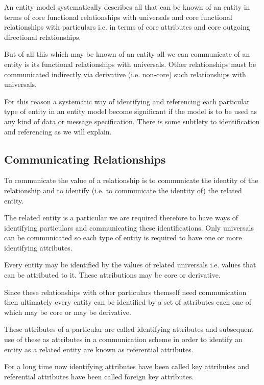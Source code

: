 \begin{oldtt}
\mynote An entity model systematically describes all that can be known of an entity
in terms of core functional relationships with universals and core functional relationships with particulars i.e. in terms of core attributes and core outgoing directional relationships.

\mynote But of all this which  may be known of an entity all we can communicate of an entity is its functional relationships with universals. Other relationships must be communicated indirectly via derivative (i.e. non-core) such relationships with universals. 

\mynote For this reason a systematic way of identifying and referencing each particular type  of entity in an entity model become significant if the model is to be used as any kind of data or message specification. There is some subtlety to identification and referencing as we will explain.

\subsection*{Communicating Relationships}
\mynote To communicate the value of a relationship is to communicate the identity of the relationship and to identify (i.e. to communicate the identity of) the related entity. 

\mynote The related entity is a particular we are required therefore to have ways of identifying particulars and communicating these identifications.  
Only universals can be communicated so each type of entity is required 
to have one or more identifying attributes. 

\mynote Every entity may be identified by the values of related universals i.e. values that can be attributed to it. These attributions  may be core or derivative.
\end{oldtt}
\mynote Since these relationships with other particulars themself need communication then ultimately every entity can be identified by a set of attributes each one of which may be core or may be derivative.  

\mynote
These attributes of a particular are called identifying attributes and subsequent use of these as attributes in a communication scheme in order to identify an entity as a related entity are known as referential attributes. 

\mynote For a long time now identifying attributes have been called key attributes and referential attributes have been called foreign key attributes. 

